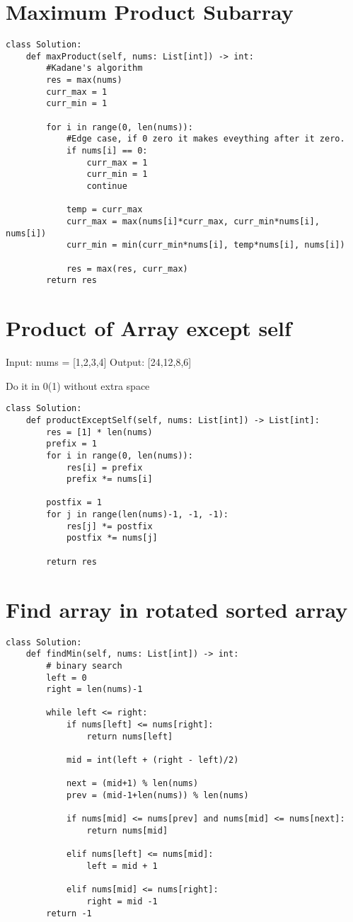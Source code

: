 \documentclass[24pt, a4]{article}
\begin{document}
\section{Maximum Product Subarray}
\begin{lstlisting}
class Solution:
    def maxProduct(self, nums: List[int]) -> int:
        #Kadane's algorithm
        res = max(nums)
        curr_max = 1
        curr_min = 1
        
        for i in range(0, len(nums)):
            #Edge case, if 0 zero it makes eveything after it zero.
            if nums[i] == 0:
                curr_max = 1
                curr_min = 1
                continue
            
            temp = curr_max
            curr_max = max(nums[i]*curr_max, curr_min*nums[i], nums[i])
            curr_min = min(curr_min*nums[i], temp*nums[i], nums[i])
            
            res = max(res, curr_max)
        return res
\end{lstlisting}
\section{Product of Array except self}
Input: nums = [1,2,3,4]
Output: [24,12,8,6]

Do it in 0(1) without extra space
\begin{lstlisting}
class Solution:
    def productExceptSelf(self, nums: List[int]) -> List[int]:
        res = [1] * len(nums)
        prefix = 1
        for i in range(0, len(nums)):
            res[i] = prefix
            prefix *= nums[i]
        
        postfix = 1
        for j in range(len(nums)-1, -1, -1):
            res[j] *= postfix
            postfix *= nums[j]
        
        return res
\end{lstlisting}
\section{Find array in rotated sorted array}
\begin{lstlisting}
class Solution:
    def findMin(self, nums: List[int]) -> int:
        # binary search
        left = 0
        right = len(nums)-1
        
        while left <= right:
            if nums[left] <= nums[right]:
                return nums[left]
            
            mid = int(left + (right - left)/2)
            
            next = (mid+1) % len(nums)
            prev = (mid-1+len(nums)) % len(nums)
            
            if nums[mid] <= nums[prev] and nums[mid] <= nums[next]:
                return nums[mid]
        
            elif nums[left] <= nums[mid]:
                left = mid + 1
            
            elif nums[mid] <= nums[right]:
                right = mid -1
        return -1
\end{lstlisting}
\end{document}
